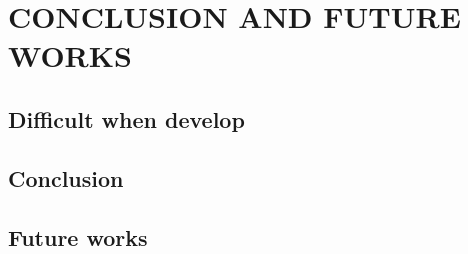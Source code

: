 \chapter{CONCLUSION AND FUTURE WORKS}
\label{ch:conclusion}
\section{Difficult when develop}
\section{Conclusion}
\section{Future works}





